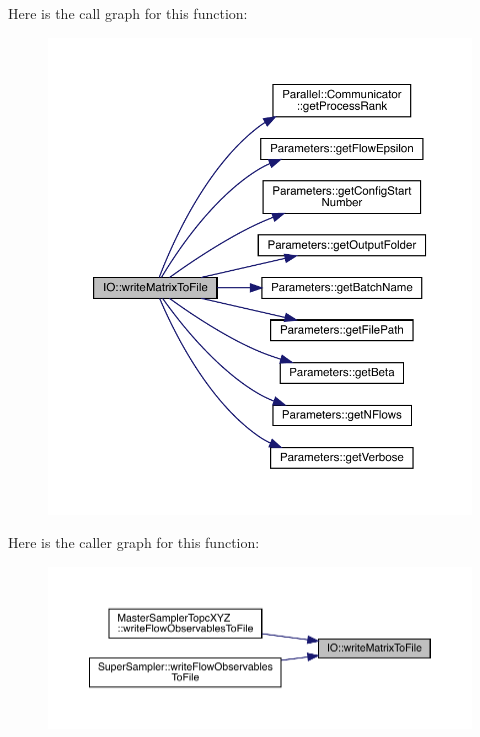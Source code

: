 Here is the call graph for this function\+:\nopagebreak
\begin{figure}[H]
\begin{center}
\leavevmode
\includegraphics[width=350pt]{namespace_i_o_ad77b7dd770afc8e2eb433d6187ea3616_cgraph}
\end{center}
\end{figure}
Here is the caller graph for this function\+:\nopagebreak
\begin{figure}[H]
\begin{center}
\leavevmode
\includegraphics[width=350pt]{namespace_i_o_ad77b7dd770afc8e2eb433d6187ea3616_icgraph}
\end{center}
\end{figure}
\mbox{\label{namespace_i_o_ad8cf5aef8f60d10b80292b69a091d5ac}} 
